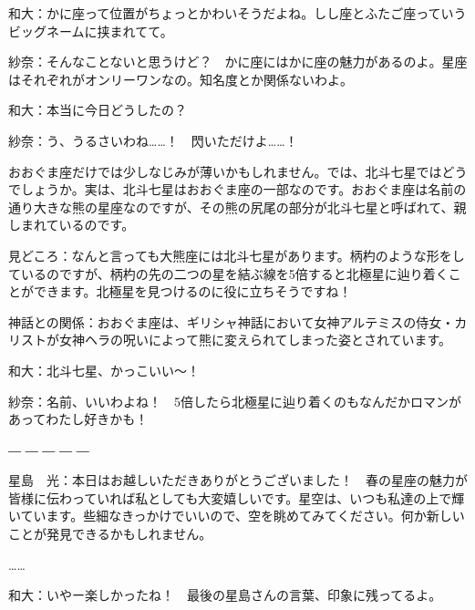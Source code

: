 \documentclass[supernova_2023]{subfiles}
\begin{document}
\phantom{a}\par
和大：かに座って位置がちょっとかわいそうだよね。しし座とふたご座っていうビッグネームに挟まれてて。


\phantom{a}\par
紗奈：そんなことないと思うけど？　かに座にはかに座の魅力があるのよ。星座はそれぞれがオンリーワンなの。知名度とか関係ないわよ。


\phantom{a}\par
和大：本当に今日どうしたの？


\phantom{a}\par
紗奈：う、うるさいわね……！　閃いただけよ……！


\phantom{a}\par
{}
{}
\begin{tcolorbox}[title=6. おおぐま座]
おおぐま座だけでは少しなじみが薄いかもしれません。では、北斗七星ではどうでしょうか。実は、北斗七星はおおぐま座の一部なのです。おおぐま座は名前の通り大きな熊の星座なのですが、その熊の尻尾の部分が北斗七星と呼ばれて、親しまれているのです。


\phantom{a}\par
見どころ：なんと言っても大熊座には北斗七星があります。柄杓のような形をしているのですが、柄杓の先の二つの星を結ぶ線を5倍すると北極星に辿り着くことができます。北極星を見つけるのに役に立ちそうですね！


\phantom{a}\par
神話との関係：おおぐま座は、ギリシャ神話において女神アルテミスの侍女・カリストが女神ヘラの呪いによって熊に変えられてしまった姿とされています。  
\end{tcolorbox}

\phantom{a}\par
和大：北斗七星、かっこいい〜！


\phantom{a}\par
紗奈：名前、いいわよね！　5倍したら北極星に辿り着くのもなんだかロマンがあってわたし好きかも！

― ― ― ― ―


\phantom{a}\par
星島　光：本日はお越しいただきありがとうございました！　春の星座の魅力が皆様に伝わっていれば私としても大変嬉しいです。星空は、いつも私達の上で輝いています。些細なきっかけでいいので、空を眺めてみてください。何か新しいことが発見できるかもしれません。


\phantom{a}\par
……


\phantom{a}\par
和大：いやー楽しかったね！　最後の星島さんの言葉、印象に残ってるよ。
\end{document}
